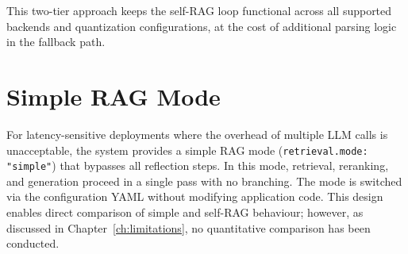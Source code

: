 This two-tier approach keeps the self-RAG loop functional across all supported backends and quantization configurations, at the cost of additional parsing logic in the fallback path.

\section{Simple RAG Mode}

For latency-sensitive deployments where the overhead of multiple LLM calls is unacceptable, the system provides a simple RAG mode (\texttt{retrieval.mode: "simple"}) that bypasses all reflection steps. In this mode, retrieval, reranking, and generation proceed in a single pass with no branching. The mode is switched via the configuration YAML without modifying application code. This design enables direct comparison of simple and self-RAG behaviour; however, as discussed in Chapter~\ref{ch:limitations}, no quantitative comparison has been conducted.
